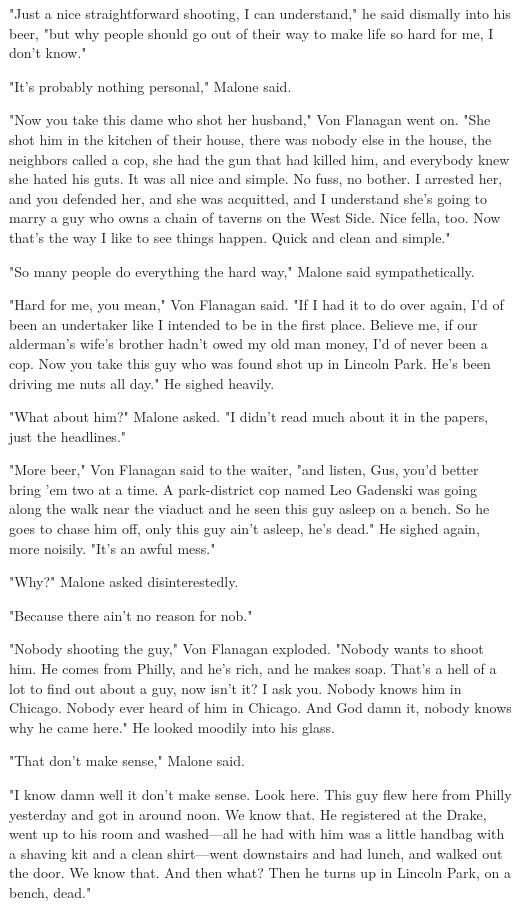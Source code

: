 \documentclass{novel}
\begin{document}
"Just a nice straightforward shooting, I can understand," he said dismally into his beer, "but why people should go out of their way to make life so hard for me, I don't know."

"It's probably nothing personal," Malone said.

"Now you take this dame who shot her husband," Von Flanagan went on. "She shot him in the kitchen of their house, there was nobody else in the house, the neighbors called a cop, she had the gun that had killed him, and everybody knew she hated his guts. It was all nice and simple. No fuss, no bother. I arrested her, and you defended her, and she was acquitted, and I understand she's going to marry a guy who owns a chain of taverns on the West Side. Nice fella, too. Now that's the way I like to see things happen. Quick and clean and simple."

"So many people do everything the hard way," Malone said sympathetically.

"Hard for me, you mean," Von Flanagan said. "If I had it to do over again, I'd of been an undertaker like I intended to be in the first place. Believe me, if our alderman's wife's brother hadn't owed my old man money, I'd of never been a cop. Now you take this guy who was found shot up in Lincoln Park. He's been driving me nuts all day." He sighed heavily.

"What about him?" Malone asked. "I didn't read much about it in the papers, just the headlines."

"More beer," Von Flanagan said to the waiter, "and listen, Gus, you'd better bring 'em two at a time. A park-district cop named Leo Gadenski was going along the walk near the viaduct and he seen this guy asleep on a bench. So he goes to chase him off, only this guy ain't asleep, he's dead." He sighed again, more noisily. "It's an awful mess."

"Why?" Malone asked disinterestedly.

"Because there ain't no reason for nob."

"Nobody shooting the guy," Von Flanagan exploded. "Nobody wants to shoot him. He comes from Philly, and he's rich, and he makes soap. That's a hell of a lot to find out about a guy, now isn't it? I ask you. Nobody knows him in Chicago. Nobody ever heard of him in Chicago. And God damn it, nobody knows why he came here." He looked moodily into his glass.

"That don't make sense," Malone said.

"I know damn well it don't make sense. Look here. This guy flew here from Philly yesterday and got in around noon. We know that. He registered at the Drake, went up to his room and washed—all he had with him was a little handbag with a shaving kit and a clean shirt—went downstairs and had lunch, and walked out the door. We know that. And then what? Then he turns up in Lincoln Park, on a bench, dead."
\end{document}
